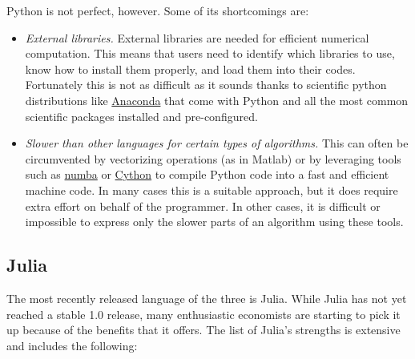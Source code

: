 Python is not perfect, however. Some of its shortcomings are:

\begin{itemize}

  \item \textit{External libraries.} External libraries are needed for
  efficient numerical computation. This means that users need to identify which
  libraries to use, know how to install them properly, and load them into their
  codes. Fortunately this is not as difficult as it sounds thanks to scientific
  python distributions like \href{https://www.continuum.io/downloads}
  {Anaconda} that come with Python and all the most common scientific packages
  installed and pre-configured.

  \item \textit{Slower than other languages for certain types of algorithms.}
  This can often be circumvented by vectorizing operations (as in Matlab) or by
  leveraging tools such as \href{http://numba.pydata.org}{numba} or
  \href{http://cython.org} {Cython} to compile Python code into a fast and
  efficient machine code. In many cases this is a suitable approach, but it
  does require extra effort on behalf of the programmer. In other cases, it is
  difficult or impossible to express only the slower parts of an algorithm
  using these tools.

\end{itemize}

\subsection{Julia}

The most recently released language of the three is Julia. While Julia has not
yet reached a stable 1.0 release, many enthusiastic economists are starting to
pick it up because of the benefits that it offers. The list of Julia's
strengths is extensive and includes the following:

